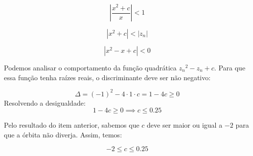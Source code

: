 \begin{enumerate}[label=(\alph*)]
        \[
        \left| \frac{x^2 + c}x \right| < 1
        \]

        \[
        \left| x^2 + c \right| < \left| z_n \right| 
        \]

        \[
        \left| x^2  -x + c \right| < 0
        \]

        Podemos analisar o comportamento da função quadrática \( {z_n}^2 - z_n + c \). Para que essa função tenha raízes reais, o discriminante deve ser não negativo:

        \[
        \Delta = (-1)^2 - 4 \cdot 1 \cdot
        c = 1 - 4c \geq 0
        \]
        Resolvendo a desigualdade:
        \[
        1 - 4c \geq 0 \implies c \leq 0.25
        \]


        Pelo resultado do item anterior, sabemos que \( c \) deve ser maior ou igual a \( -2 \) para que a órbita não diverja. Assim, temos:

        \[
        -2 \leq c \leq 0.25
        \]



\end{enumerate}